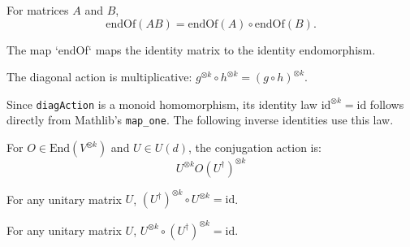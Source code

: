 {\chat
\begin{theorem}\label{thm:endOf_mul}
  \leanok
  For matrices $A$ and $B$,
  \[\text{endOf}(A B) = \text{endOf}(A) \circ \text{endOf}(B).\]
\end{theorem}
} %

\begin{theorem}\label{thm:endOf_one}
  \leanok
  The map `endOf` maps the identity matrix to the identity endomorphism.
\end{theorem}

\begin{theorem}\label{thm:diagAction_comp}
  \leanok
  The diagonal action is multiplicative: $g^{\otimes k} \circ h^{\otimes k} = (g \circ h)^{\otimes k}$.
\end{theorem}

{\chat
Since \texttt{diagAction} is a monoid homomorphism, its identity law
$\text{id}^{\otimes k}=\text{id}$ follows directly from Mathlib's
\texttt{map\_one}. The following inverse identities use this law.
} %

\begin{definition}\label{def:actOn}
  \leanok
  For $O \in \text{End}(V^{\otimes k})$ and $U \in U(d)$, the conjugation action is:
  \begin{equation}
    U^{\otimes k} O (U^\dagger)^{\otimes k}
  \end{equation}
\end{definition}

{\chat
\begin{theorem}\label{thm:diagAction_endOf_unitary_left}
  \leanok
  For any unitary matrix $U$, $(U^\dagger)^{\otimes k} \circ U^{\otimes k} = \text{id}$.
\end{theorem}
} %

{\chat
\begin{theorem}\label{thm:diagAction_endOf_unitary_right}
  \leanok
  For any unitary matrix $U$, $U^{\otimes k} \circ (U^\dagger)^{\otimes k} = \text{id}$.
\end{theorem}
} %


